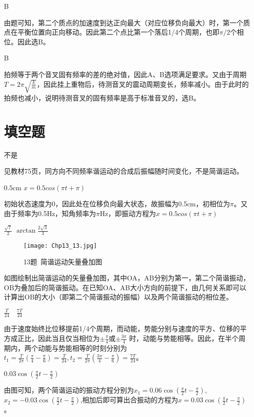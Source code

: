 \exercise B

\solve 
由题可知，第二个质点的加速度到达正向最大（对应位移负向最大）时，第一个质点在平衡位置向正向移动。因此第二个点比第一个落后1/4个周期，也即$\pi/2$个相位。因此选B。

\exercise B

\solve
拍频等于两个音叉固有频率的差的绝对值，因此A、B选项满足要求。又由于周期$T=2\pi\sqrt{\frac{k}{m}}$，因此挂上重物后，待测音叉的震动周期变长，频率减小。由于此时的拍频也减小，说明待测音叉的固有频率是高于标准音叉的，选B。

\section{填空题}
\exercise 不是

\solve 
见教材75页，同方向不同频率谐运动的合成后振幅随时间变化，不是简谐运动。

\exercise $0.5\mathrm{cm}$ \quad $x=0.5cos(\pi t+\pi)$

\solve
初始状态速度为0，因此处在位移负向最大状态，故振幅为0.5cm，初相位为$\pi$。又由于频率为0.5Hz，知角频率为$\pi$Hz，即振动方程为$x=0.5cos(\pi t+\pi)$
 
\exercise $\frac{\sqrt{7}}{2}$ \quad $\arctan{\frac{2\sqrt{3}}{3}}$

\solve
\begin{figure}[htbp]
\centering
\texttt{[image: Chp13\_13.jpg]}
\caption{13题\ 简谐运动矢量叠加图}
\end{figure}
如图绘制出简谐运动的矢量叠加图，其中OA，AB分别为第一，第二个简谐振动，OB为叠加后的简谐振动。在已知OA、AB大小方向的前提下，由几何关系即可以计算出OB的大小（即第二个简谐振动的振幅）以及两个简谐振动的相位差。

\exercise $\frac{T}{24} \quad \frac{7T}{24}$

\solve
由于速度始终比位移提前1/4个周期，而动能，势能分别与速度的平方、位移的平方成正比，因此当且仅当相位为$\pm\frac{\pi}{4}$或$\pm\frac{3\pi}{4}$ 时，动能与势能相等。因此，在半个周期内，两个动能与势能相等的时刻分别为$t_1=\frac{T}{2\pi}\left(\frac{\pi}{4}-\frac{\pi}{6}\right)=\frac{T}{24}, t_2=\frac{T}{2\pi}\left(\frac{3\pi}{4}-\frac{\pi}{6}\right)=\frac{7T}{24}$。

\exercise $0.03\cos(\frac{\pi}{2}t-\frac{\pi}{2})$

\solve
由图可知，两个简谐运动的振动方程分别为$x_1=0.06\cos(\frac{\pi}{2}t-\frac{\pi}{2})$,$x_2=-0.03\cos(\frac{\pi}{2}t-\frac{\pi}{2})$,相加后即可算出合振动的方程为$x=0.03\cos(\frac{\pi}{2}t-\frac{\pi}{2})$。

